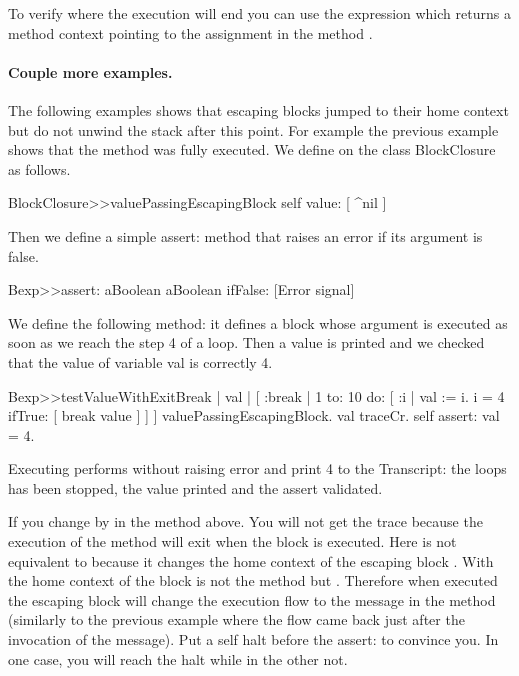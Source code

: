 \documentclass[a4paper,10pt,twoside]{book}
\begin{document}
To verify where the execution will end you can use the expression  which returns a method context pointing to the assignment in the method .

\paragraph{Couple more examples.}
The following examples shows that escaping blocks jumped to their home context but do not unwind the stack after this point. For example the previous example shows that the method  was fully executed.
We define  on the class BlockClosure as follows.

\begin{code}{}
BlockClosure>>valuePassingEscapingBlock
	  self value: [ ^nil ]
\end{code}

Then we define a simple assert: method that raises an error if its argument is false.

\begin{code}{}
Bexp>>assert: aBoolean
	aBoolean ifFalse: [Error signal]
\end{code}

We define the following method: it defines a block whose argument is executed as soon as we reach the step 4 of a loop. Then a value is printed and we checked that the value of variable val is correctly 4.

\begin{code}{}
Bexp>>testValueWithExitBreak
	| val |
	[ :break |
	    1 to: 10 do: [ :i |
			         val := i.
			         i = 4 ifTrue: [ break value ] ] ] valuePassingEscapingBlock.
	val traceCr.
	self assert: val = 4.
\end{code}

Executing  performs without raising error and print 4 to the Transcript: the loops has been stopped, the value printed and the assert validated.

If you change  by  in the method above. You will not get the trace because the execution of the method  will exit when the block is executed. Here  is not equivalent to  because it changes the home context of the escaping block \ct{[ ^ nil ]}.  With  the home context of the block \ct{[^ nil]}
is not the method  but .
Therefore when executed the escaping block will change the execution flow to the  message in the method  (similarly to the previous example where the flow came back just after the invocation of the  message).
Put a self halt before the assert: to convince you. In one case, you will reach the halt while in the other not.
\end{document}
